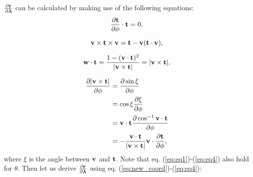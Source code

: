 \documentclass[12pt,a4paper]{scrarticle}
\begin{document}
$\frac{\partial{\mathbf{r}}}{\partial{\boldsymbol{\lambda}}}$ can be calculated by making use of the following equations:
\begin{equation}\label{eq:eq1}
    \frac{\partial \mathbf{t}}{\partial \phi} \cdot \mathbf{t} = 0,
\end{equation}

\begin{equation}\label{eq:eq2}
    \mathbf{v} \times \mathbf{t} \times \mathbf{v} = \mathbf{t} - \mathbf{v}(\mathbf{t} \cdot \mathbf{v}),
\end{equation}

\begin{equation}\label{eq:eq3}
    \mathbf{w} \cdot \mathbf{t} = \frac{1- (\mathbf{v} \cdot \mathbf{t})^2}{|\mathbf{v} \times \mathbf{t}|} = |\mathbf{v} \times \mathbf{t}|,
\end{equation}

\begin{align}\label{eq:eq4}
   \frac{\partial |\mathbf{v} \times \mathbf{t}|}{\partial \phi} & = \frac{\partial \sin{\xi}}{\partial \phi} \nonumber \\
   & = \cos{\xi} \frac{\partial \xi}{\partial \phi} \nonumber \\
   & = \mathbf{v} \cdot \mathbf{t} \frac{\partial \cos^{-1}{\mathbf{v} \cdot \mathbf{t}}}{\partial \phi} \nonumber \\
   & = - \frac{\mathbf{v} \cdot \mathbf{t}}{|\mathbf{v} \times \mathbf{t}|} \mathbf{v} \cdot \frac{\partial \mathbf{t}}{\partial \phi},
\end{align}
where $\xi$ is the angle between $\mathbf{v}$ and $\mathbf{t}$. Note that eq. (\ref{eq:eq1})-(\ref{eq:eq4}) also hold for $\theta$. Then let us derive $\frac{\partial{\mathbf{r}} }{\partial{\boldsymbol{\lambda}}}$ using eq. (\ref{eq:new_coord})-(\ref{eq:eq4}):
\end{document}
